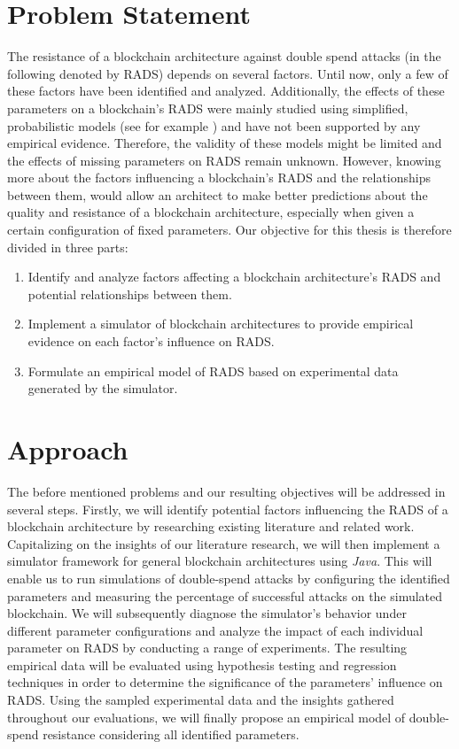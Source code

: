 \documentclass[a4paper,12pt,twoside]{report}
\begin{document}
\section{Problem Statement}
The resistance of a blockchain architecture against double spend attacks (in the following denoted by RADS) depends on several factors. Until now, only a few of these factors have been identified and analyzed. Additionally, the effects of these parameters on a blockchain's RADS were mainly studied using simplified, probabilistic models (see for example \cite{nakamoto2008bitcoin,HBDSA}) and have not been supported by any empirical evidence. Therefore, the validity of these models might be limited and the effects of missing parameters on RADS remain unknown. However, knowing more about the factors influencing a blockchain's RADS and the relationships between them, would allow an architect to make better predictions about the quality and resistance of a blockchain architecture, especially when given a certain configuration of fixed parameters. Our objective for this thesis is therefore divided in three parts:
\begin{enumerate}
\item Identify and analyze factors affecting a blockchain architecture's RADS and potential relationships between them.
\item Implement a simulator of blockchain architectures to provide empirical evidence on each factor's influence on RADS.
\item Formulate an empirical model of RADS based on experimental data generated by the simulator. 
\end{enumerate}
\section{Approach}
The before mentioned problems and our resulting objectives will be addressed in several steps. Firstly, we will identify potential factors influencing the RADS of a blockchain architecture by researching existing literature and related work. Capitalizing on the insights of our literature research, we will then implement a simulator framework for general blockchain architectures using \textit{Java}. This will enable us to run simulations of double-spend attacks by configuring the identified parameters and measuring the percentage of successful attacks on the simulated blockchain. We will subsequently diagnose the simulator's behavior under different parameter configurations and analyze the impact of each individual parameter on RADS by conducting a range of experiments. The resulting empirical data will be evaluated using hypothesis testing and regression techniques in order to determine the significance of the parameters' influence on RADS. Using the sampled experimental data and the insights gathered throughout our evaluations, we will finally propose an empirical model of double-spend resistance considering all identified parameters.
\end{document}
